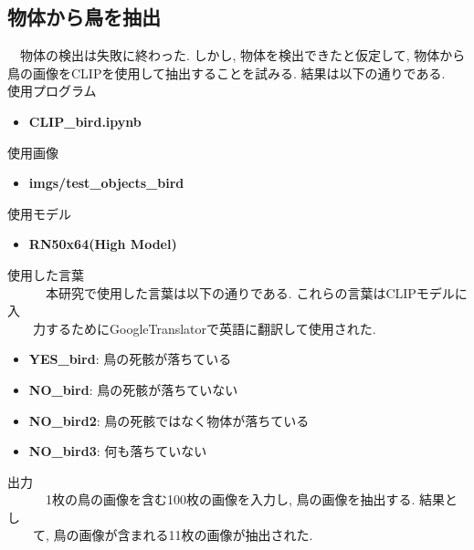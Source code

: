 \documentclass[a4paper, 12pt]{report}
\begin{document}
\subsection{物体から鳥を抽出}
　物体の検出は失敗に終わった. しかし, 物体を検出できたと仮定して, 物体から鳥の画像をCLIPを使用して抽出することを試みる. 結果は以下の通りである. \\

使用プログラム
\begin{itemize}
    \item \textbf{CLIP\_bird.ipynb}
\end{itemize}

使用画像
\begin{itemize}
    \item \textbf{imgs/test\_objects\_bird}
\end{itemize}

使用モデル
\begin{itemize}
    \item \textbf{RN50x64(High Model)}
\end{itemize}

使用した言葉\\
　　　本研究で使用した言葉は以下の通りである. これらの言葉はCLIPモデルに入\\
　　力するためにGoogleTranslatorで英語に翻訳して使用された. 
\begin{itemize}
    \item \textbf{YES\_bird}: 鳥の死骸が落ちている
    \item \textbf{NO\_bird}: 鳥の死骸が落ちていない
    \item \textbf{NO\_bird2}: 鳥の死骸ではなく物体が落ちている
    \item \textbf{NO\_bird3}: 何も落ちていない
\end{itemize}

出力\\
　　　1枚の鳥の画像を含む100枚の画像を入力し, 鳥の画像を抽出する. 結果とし\\
　　て, 鳥の画像が含まれる11枚の画像が抽出された. 
\end{document}
